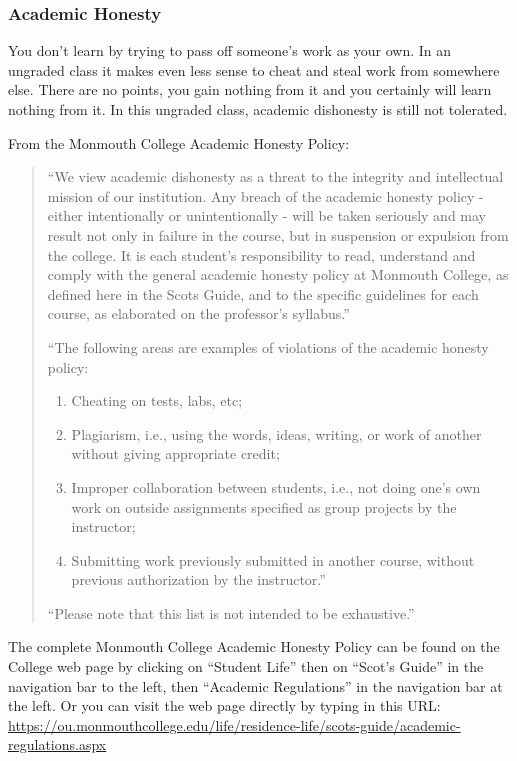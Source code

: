 \documentclass[10pt]{article}
\begin{document}
\subsubsection*{Academic Honesty}

You don't learn by trying to pass off someone's work as your own. In an ungraded class it makes even less sense to cheat and steal work from somewhere else.  There are no points, you gain nothing from it and you certainly will learn nothing from it. In this ungraded class, academic dishonesty is still not tolerated.

From the Monmouth College Academic Honesty Policy:
\begin{quote}
  ``We view academic dishonesty as a threat to the integrity and intellectual mission of our institution. Any breach of the academic honesty policy - either intentionally or unintentionally - will be taken seriously and may result not only in failure in the course, but in suspension or expulsion from the college. It is each student’s responsibility to read, understand and comply with the general academic honesty policy at Monmouth College, as defined here in the Scots Guide, and to the specific guidelines for each course, as elaborated on the professor’s syllabus.''

  ``The following areas are examples of violations of the academic honesty policy:
  \begin{enumerate}
  \item Cheating on tests, labs, etc;
  \item Plagiarism, i.e., using the words, ideas, writing, or work of another without giving appropriate credit;
  \item Improper collaboration between students, i.e., not doing one’s own work on outside assignments specified as group projects by the instructor;
  \item Submitting work previously submitted in another course, without previous authorization by the instructor.''
  \end{enumerate}

  ``Please note that this list is not intended to be exhaustive.''
\end{quote}

The complete Monmouth College Academic Honesty Policy can be found on the College web page by clicking on ``Student Life'' then on ``Scot’s Guide'' in the navigation bar to the left, then ``Academic Regulations'' in the navigation bar at the left.  Or you can visit the web page directly by typing in this URL: \url{https://ou.monmouthcollege.edu/life/residence-life/scots-guide/academic-regulations.aspx}
\end{document}
